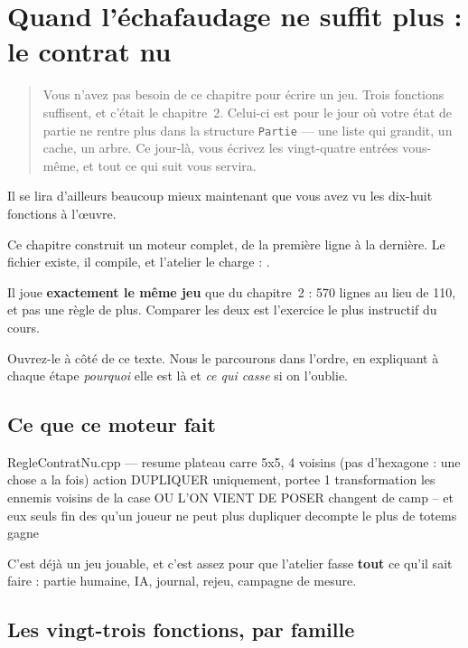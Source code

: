 \chapter{Quand l'échafaudage ne suffit plus : le contrat nu}

\begin{quote}
Vous n'avez pas besoin de ce chapitre pour écrire un jeu. Trois fonctions
suffisent, et c'était le chapitre~2. Celui-ci est pour le jour où votre état de
partie ne rentre plus dans la structure \texttt{Partie} --- une liste qui
grandit, un cache, un arbre. Ce jour-là, vous écrivez les vingt-quatre entrées
vous-même, et tout ce qui suit vous servira.
\end{quote}

Il se lira d'ailleurs beaucoup mieux maintenant que vous avez vu les dix-huit
fonctions à l'œuvre.

Ce chapitre construit un moteur complet, de la première ligne à la dernière. Le
fichier existe, il compile, et l'atelier le charge :
.

Il joue \textbf{exactement le même jeu} que
 du chapitre~2 : 570 lignes au lieu de
110, et pas une règle de plus. Comparer les deux est l'exercice le plus
instructif du cours.

Ouvrez-le à côté de ce texte. Nous le parcourons dans l'ordre, en expliquant à
chaque étape \emph{pourquoi} elle est là et \emph{ce qui casse} si on l'oublie.

\section{Ce que ce moteur fait}

\begin{nkcode}{RegleContratNu.cpp — resume}
plateau         carre 5x5, 4 voisins  (pas d'hexagone : une chose a la fois)
action          DUPLIQUER uniquement, portee 1
transformation  les ennemis voisins de la case OU L'ON VIENT DE POSER
                changent de camp -- et eux seuls
fin             des qu'un joueur ne peut plus dupliquer
decompte        le plus de totems gagne
\end{nkcode}

C'est déjà un jeu jouable, et c'est assez pour que l'atelier fasse \textbf{tout}
ce qu'il sait faire : partie humaine, IA, journal, rejeu, campagne de mesure.

\section{Les vingt-trois fonctions, par famille}

